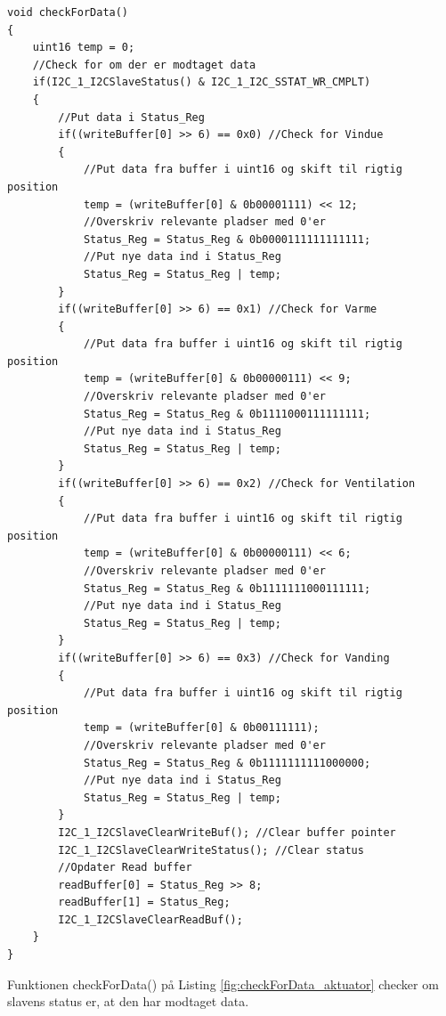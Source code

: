 \begin{lstlisting}[caption=Udsnit af checkForData.c for PSoC4 i Aktuator, label=fig:checkForData_aktuator]
void checkForData()
{
    uint16 temp = 0;
    //Check for om der er modtaget data
    if(I2C_1_I2CSlaveStatus() & I2C_1_I2C_SSTAT_WR_CMPLT)
    {
        //Put data i Status_Reg            
        if((writeBuffer[0] >> 6) == 0x0) //Check for Vindue
        {
            //Put data fra buffer i uint16 og skift til rigtig position
            temp = (writeBuffer[0] & 0b00001111) << 12; 
            //Overskriv relevante pladser med 0'er
            Status_Reg = Status_Reg & 0b0000111111111111;
            //Put nye data ind i Status_Reg
            Status_Reg = Status_Reg | temp;                
        }           
        if((writeBuffer[0] >> 6) == 0x1) //Check for Varme
        {
            //Put data fra buffer i uint16 og skift til rigtig position
            temp = (writeBuffer[0] & 0b00000111) << 9; 
            //Overskriv relevante pladser med 0'er
            Status_Reg = Status_Reg & 0b1111000111111111;
            //Put nye data ind i Status_Reg
            Status_Reg = Status_Reg | temp;                
        }           
        if((writeBuffer[0] >> 6) == 0x2) //Check for Ventilation
        {
            //Put data fra buffer i uint16 og skift til rigtig position
            temp = (writeBuffer[0] & 0b00000111) << 6; 
            //Overskriv relevante pladser med 0'er
            Status_Reg = Status_Reg & 0b1111111000111111;
            //Put nye data ind i Status_Reg
            Status_Reg = Status_Reg | temp;                
        }            
        if((writeBuffer[0] >> 6) == 0x3) //Check for Vanding
        {
            //Put data fra buffer i uint16 og skift til rigtig position
            temp = (writeBuffer[0] & 0b00111111); 
            //Overskriv relevante pladser med 0'er
            Status_Reg = Status_Reg & 0b1111111111000000;
            //Put nye data ind i Status_Reg
            Status_Reg = Status_Reg | temp;                
        }                    
        I2C_1_I2CSlaveClearWriteBuf(); //Clear buffer pointer
        I2C_1_I2CSlaveClearWriteStatus(); //Clear status                       
        //Opdater Read buffer
        readBuffer[0] = Status_Reg >> 8;
        readBuffer[1] = Status_Reg;     
        I2C_1_I2CSlaveClearReadBuf();
    }
}
\end{lstlisting}

\clearpage

Funktionen checkForData() på Listing \ref{fig:checkForData_aktuator} checker om slavens status er, at den har modtaget data. 

